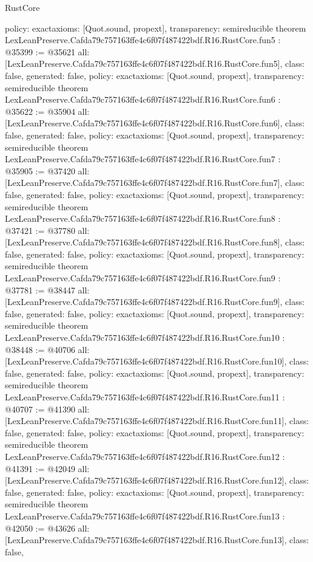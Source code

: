 \begin{lexlean}{RustCore}
\begin{coremodule}
{  policy: exact{axioms: [Quot.sound, propext]},
  transparency: semireducible
}
theorem LexLeanPreserve.Cafda79c757163ffe4c6f07f487422bdf.R16.RustCore.fun5 : @35399 := @35621 {
  all: [LexLeanPreserve.Cafda79c757163ffe4c6f07f487422bdf.R16.RustCore.fun5],
  class: false,
  generated: false,
  policy: exact{axioms: [Quot.sound, propext]},
  transparency: semireducible
}
theorem LexLeanPreserve.Cafda79c757163ffe4c6f07f487422bdf.R16.RustCore.fun6 : @35622 := @35904 {
  all: [LexLeanPreserve.Cafda79c757163ffe4c6f07f487422bdf.R16.RustCore.fun6],
  class: false,
  generated: false,
  policy: exact{axioms: [Quot.sound, propext]},
  transparency: semireducible
}
theorem LexLeanPreserve.Cafda79c757163ffe4c6f07f487422bdf.R16.RustCore.fun7 : @35905 := @37420 {
  all: [LexLeanPreserve.Cafda79c757163ffe4c6f07f487422bdf.R16.RustCore.fun7],
  class: false,
  generated: false,
  policy: exact{axioms: [Quot.sound, propext]},
  transparency: semireducible
}
theorem LexLeanPreserve.Cafda79c757163ffe4c6f07f487422bdf.R16.RustCore.fun8 : @37421 := @37780 {
  all: [LexLeanPreserve.Cafda79c757163ffe4c6f07f487422bdf.R16.RustCore.fun8],
  class: false,
  generated: false,
  policy: exact{axioms: [Quot.sound, propext]},
  transparency: semireducible
}
theorem LexLeanPreserve.Cafda79c757163ffe4c6f07f487422bdf.R16.RustCore.fun9 : @37781 := @38447 {
  all: [LexLeanPreserve.Cafda79c757163ffe4c6f07f487422bdf.R16.RustCore.fun9],
  class: false,
  generated: false,
  policy: exact{axioms: [Quot.sound, propext]},
  transparency: semireducible
}
theorem LexLeanPreserve.Cafda79c757163ffe4c6f07f487422bdf.R16.RustCore.fun10 : @38448 := @40706 {
  all: [LexLeanPreserve.Cafda79c757163ffe4c6f07f487422bdf.R16.RustCore.fun10],
  class: false,
  generated: false,
  policy: exact{axioms: [Quot.sound, propext]},
  transparency: semireducible
}
theorem LexLeanPreserve.Cafda79c757163ffe4c6f07f487422bdf.R16.RustCore.fun11 : @40707 := @41390 {
  all: [LexLeanPreserve.Cafda79c757163ffe4c6f07f487422bdf.R16.RustCore.fun11],
  class: false,
  generated: false,
  policy: exact{axioms: [Quot.sound, propext]},
  transparency: semireducible
}
theorem LexLeanPreserve.Cafda79c757163ffe4c6f07f487422bdf.R16.RustCore.fun12 : @41391 := @42049 {
  all: [LexLeanPreserve.Cafda79c757163ffe4c6f07f487422bdf.R16.RustCore.fun12],
  class: false,
  generated: false,
  policy: exact{axioms: [Quot.sound, propext]},
  transparency: semireducible
}
theorem LexLeanPreserve.Cafda79c757163ffe4c6f07f487422bdf.R16.RustCore.fun13 : @42050 := @43626 {
  all: [LexLeanPreserve.Cafda79c757163ffe4c6f07f487422bdf.R16.RustCore.fun13],
  class: false,
}
\end{coremodule}
\end{lexlean}
